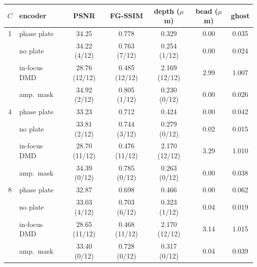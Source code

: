 \begin{tabular}{@{}cl ccc cc@{}}\toprule
$C$ & encoder & PSNR & FG-SSIM & depth ($\mu$m) & bead ($\mu$m) & ghost\\\midrule
1 & phase plate & 34.25 & 0.778 & 0.329 & 0.00 & 0.035\\
 & no plate & 34.22 (4/12) & 0.763 (7/12) & 0.254 (1/12) & 0.00 & 0.024\\
 & in-focus DMD & 28.76 (12/12) & 0.485 (12/12) & 2.169 (12/12) & 2.99 & 1.007\\
 & amp.\ mask & 34.92 (2/12) & 0.805 (1/12) & 0.230 (0/12) & 0.00 & 0.026\\
\midrule
4 & phase plate & 33.23 & 0.712 & 0.424 & 0.00 & 0.042\\
 & no plate & 33.81 (2/12) & 0.744 (3/12) & 0.279 (0/12) & 0.02 & 0.015\\
 & in-focus DMD & 28.70 (11/12) & 0.476 (11/12) & 2.170 (12/12) & 3.29 & 1.010\\
 & amp.\ mask & 34.39 (0/12) & 0.785 (0/12) & 0.263 (0/12) & 0.00 & 0.038\\
\midrule
8 & phase plate & 32.87 & 0.698 & 0.466 & 0.00 & 0.062\\
 & no plate & 33.03 (4/12) & 0.703 (6/12) & 0.323 (1/12) & 0.04 & 0.019\\
 & in-focus DMD & 28.65 (11/12) & 0.468 (11/12) & 2.170 (12/12) & 3.14 & 1.015\\
 & amp.\ mask & 33.40 (0/12) & 0.728 (0/12) & 0.317 (0/12) & 0.04 & 0.039\\
\bottomrule\end{tabular}
